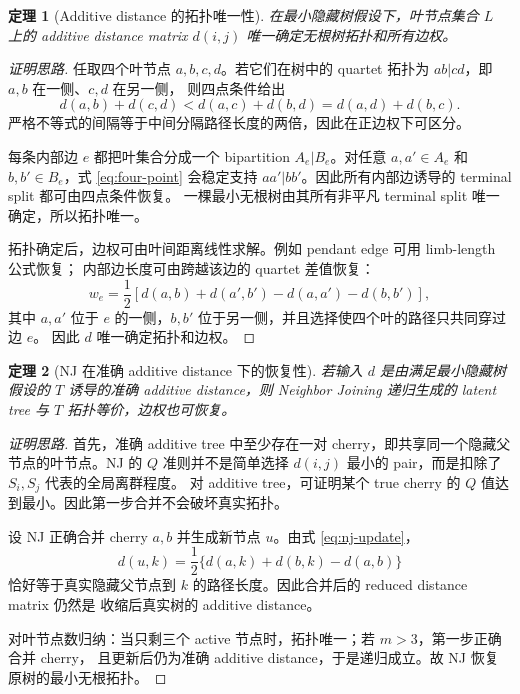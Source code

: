 \documentclass[UTF8,11pt]{ctexart}
\newtheorem{theorem}{定理}
\begin{document}
\begin{theorem}[Additive distance 的拓扑唯一性]
在最小隐藏树假设下，叶节点集合 $L$ 上的 additive distance matrix $d(i,j)$ 唯一确定无根树拓扑和所有边权。
\end{theorem}

\begin{proof}[证明思路]
任取四个叶节点 $a,b,c,d$。若它们在树中的 quartet 拓扑为 $ab|cd$，即 $a,b$ 在一侧、$c,d$ 在另一侧，
则四点条件给出
\begin{equation}
  d(a,b)+d(c,d)
  <
  d(a,c)+d(b,d)
  =
  d(a,d)+d(b,c).
  \label{eq:four-point}
\end{equation}
严格不等式的间隔等于中间分隔路径长度的两倍，因此在正边权下可区分。

每条内部边 $e$ 都把叶集合分成一个 bipartition $A_e|B_e$。对任意
$a,a'\in A_e$ 和 $b,b'\in B_e$，式 \eqref{eq:four-point} 会稳定支持
$aa'|bb'$。因此所有内部边诱导的 terminal split 都可由四点条件恢复。
一棵最小无根树由其所有非平凡 terminal split 唯一确定，所以拓扑唯一。

拓扑确定后，边权可由叶间距离线性求解。例如 pendant edge 可用 limb-length 公式恢复；
内部边长度可由跨越该边的 quartet 差值恢复：
\begin{equation}
  w_e
  =
  \frac{1}{2}\left[
  d(a,b)+d(a',b')-d(a,a')-d(b,b')
  \right],
\end{equation}
其中 $a,a'$ 位于 $e$ 的一侧，$b,b'$ 位于另一侧，并且选择使四个叶的路径只共同穿过边 $e$。
因此 $d$ 唯一确定拓扑和边权。
\end{proof}

\begin{theorem}[NJ 在准确 additive distance 下的恢复性]
若输入 $d$ 是由满足最小隐藏树假设的 $T$ 诱导的准确 additive distance，则 Neighbor Joining
递归生成的 latent tree 与 $T$ 拓扑等价，边权也可恢复。
\end{theorem}

\begin{proof}[证明思路]
首先，准确 additive tree 中至少存在一对 cherry，即共享同一个隐藏父节点的叶节点。NJ 的
$Q$ 准则并不是简单选择 $d(i,j)$ 最小的 pair，而是扣除了 $S_i,S_j$ 代表的全局离群程度。
对 additive tree，可证明某个 true cherry 的 $Q$ 值达到最小。因此第一步合并不会破坏真实拓扑。

设 NJ 正确合并 cherry $a,b$ 并生成新节点 $u$。由式 \eqref{eq:nj-update}，
\[
  d(u,k)=\frac{1}{2}\{d(a,k)+d(b,k)-d(a,b)\}
\]
恰好等于真实隐藏父节点到 $k$ 的路径长度。因此合并后的 reduced distance matrix 仍然是
收缩后真实树的 additive distance。

对叶节点数归纳：当只剩三个 active 节点时，拓扑唯一；若 $m>3$，第一步正确合并 cherry，
且更新后仍为准确 additive distance，于是递归成立。故 NJ 恢复原树的最小无根拓扑。
\end{proof}
\end{document}
